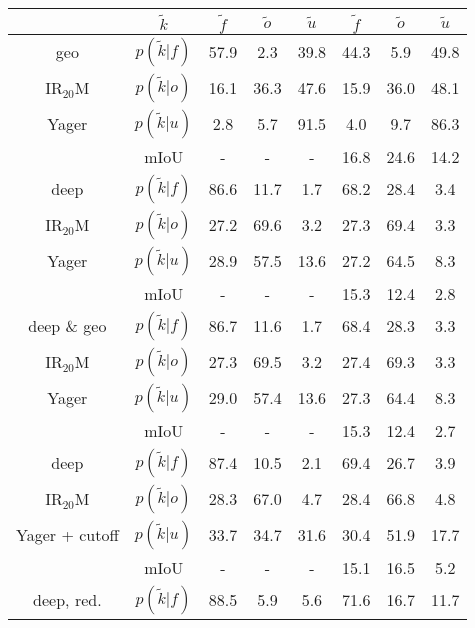\begin{center}
	\begin{tabular}{c|c|ccc|ccc}
		& $\tilde{k}$ & $\tilde{f}$ & $\tilde{o}$ & $\tilde{u}$ & $\tilde{f}$ & $\tilde{o}$ & $\tilde{u}$\\
		\hline
		geo&$p(\tilde{k}|f)$ & \textcolor{mygreen}{57.9} & \textcolor{myred}{2.3} & 39.8& \textcolor{mygreen}{44.3} & \textcolor{myred}{5.9} & 49.8 \\
		IR$_{20}$M&$p(\tilde{k}|o)$ & \textcolor{myred}{16.1} & \textcolor{mygreen}{36.3} & 47.6& \textcolor{myred}{15.9} & \textcolor{mygreen}{36.0} & 48.1 \\
		Yager&$p(\tilde{k}|u)$ & 2.8 & 5.7 & 91.5& 4.0 & 9.7 & 86.3 \\
		& mIoU & - & - & - &16.8&24.6&14.2 \\
		\hline	
		deep&$p(\tilde{k}|f)$ & \textcolor{mygreen}{86.6} & \textcolor{myred}{11.7} & 1.7& \textcolor{mygreen}{68.2} & \textcolor{myred}{28.4} & 3.4 \\
		IR$_{20}$M&$p(\tilde{k}|o)$ & \textcolor{myred}{27.2} & \textcolor{mygreen}{69.6} & 3.2& \textcolor{myred}{27.3} & \textcolor{mygreen}{69.4} & 3.3 \\
		Yager&$p(\tilde{k}|u)$ & 28.9 & 57.5 & 13.6& 27.2 & 64.5 & 8.3 \\
		& mIoU & - & - & - &15.3&12.4&2.8 \\
		\hline
		deep \& geo&$p(\tilde{k}|f)$ & \textcolor{mygreen}{86.7} & \textcolor{myred}{11.6} & 1.7& \textcolor{mygreen}{68.4} & \textcolor{myred}{28.3} & 3.3 \\
		IR$_{20}$M&$p(\tilde{k}|o)$ & \textcolor{myred}{27.3} & \textcolor{mygreen}{69.5} & 3.2& \textcolor{myred}{27.4} & \textcolor{mygreen}{69.3} & 3.3 \\
		Yager&$p(\tilde{k}|u)$ & 29.0 & 57.4 & 13.6& 27.3 & 64.4 & 8.3 \\
		& mIoU & - & - & - &15.3&12.4&2.7 \\
		\hline
		deep&$p(\tilde{k}|f)$ & \textcolor{mygreen}{87.4} & \textcolor{myred}{10.5} & 2.1& \textcolor{mygreen}{69.4} & \textcolor{myred}{26.7} & 3.9 \\
		IR$_{20}$M&$p(\tilde{k}|o)$ & \textcolor{myred}{28.3} & \textcolor{mygreen}{67.0} & 4.7& \textcolor{myred}{28.4} & \textcolor{mygreen}{66.8} & 4.8 \\
		Yager + cutoff&$p(\tilde{k}|u)$ & 33.7 & 34.7 & 31.6& 30.4 & 51.9 & 17.7 \\
		& mIoU & - & - & - &15.1&16.5&5.2 \\			
		\hline
		deep, red.&$p(\tilde{k}|f)$ & \textcolor{mygreen}{88.5} & \textcolor{myred}{5.9} & 5.6& \textcolor{mygreen}{71.6} & \textcolor{myred}{16.7} & 11.7 \\

\end{tabular}
\end{center}
